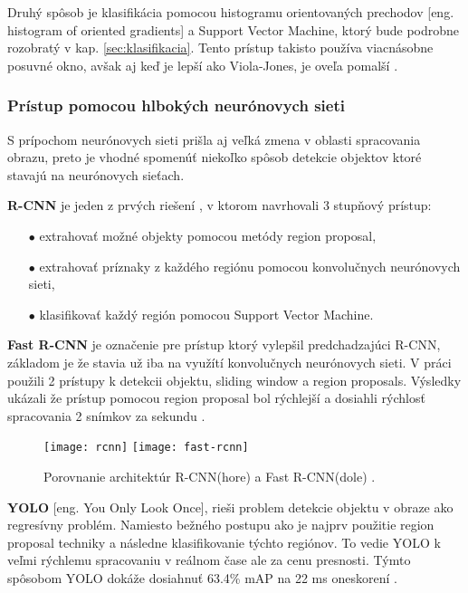 Druhý spôsob je klasifikácia pomocou histogramu orientovaných prechodov [eng. histogram of oriented gradients] a Support Vector Machine, ktorý bude podrobne
    rozobratý v kap. \ref{sec:klasifikacia}. Tento prístup takisto používa viacnásobne posuvné okno, avšak aj keď je lepší ako Viola-Jones, je oveľa pomalší \cite{odkaz:ObjectDetectionOverview}.

\subsubsection{Prístup pomocou hlbokých neurónovych sieti}
S prípochom neurónovych sieti prišla aj veľká zmena v oblasti spracovania obrazu, preto je vhodné spomenúť niekoľko spôsob
    detekcie objektov ktoré stavajú na neurónovych sieťach.

\textbf{R-CNN} je jeden z prvých riešení \cite{prop:rcnn}, v ktorom navrhovali 3 stupňový prístup:
\begin{enumerate}
	\item[$\bullet$] extrahovať možné objekty pomocou metódy region proposal,
    \item[$\bullet$] extrahovať príznaky z každého regiónu pomocou konvolučnych neurónovych sieti,
    \item[$\bullet$] klasifikovať každý región pomocou Support Vector Machine.
\end{enumerate}

\textbf{Fast R-CNN} je označenie pre prístup ktorý vylepšil predchadzajúci R-CNN, základom je že stavia už iba na využítí konvolučnych neurónovych sieti.
V práci použili 2 prístupy k detekcii objektu, sliding window a region proposals.
Výsledky ukázali že prístup pomocou region proposal bol rýchlejší a dosiahli rýchlosť spracovania 2 snímkov za sekundu \cite{prop:fast-rcnn}.
\begin{figure}[H]
    \centering
    \texttt{[image: rcnn]}
    \qquad
    \texttt{[image: fast-rcnn]}
    \caption{Porovnanie architektúr R-CNN(hore) a Fast R-CNN(dole) \cite{odkaz:ObjectDetectionOverview}.}
    \label{pic:FastRCNN}
\end{figure}

\textbf{YOLO} [eng. You Only Look Once], rieši problem detekcie objektu v obraze ako regresívny problém.
Namiesto bežného postupu ako je najprv použitie region proposal techniky a následne klasifikovanie týchto regiónov.
To vedie YOLO k veľmi rýchlemu spracovaniu v reálnom čase ale za cenu presnosti.
Týmto spôsobom YOLO dokáže dosiahnuť 63.4\% mAP na 22 ms oneskorení \cite{prop:Redmon2016YouOL}.

